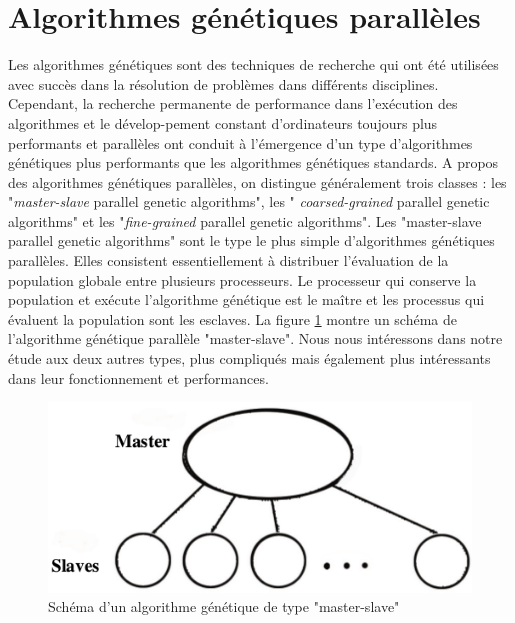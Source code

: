 \documentclass[12pt,a4paper]{article}
\begin{document}
	\section{Algorithmes génétiques parallèles}	
	Les algorithmes génétiques sont des techniques de recherche qui ont été utilisées avec succès dans la résolution de problèmes dans différents disciplines. Cependant, la recherche permanente de performance dans l'exécution des algorithmes et le dévelop-pement constant d'ordinateurs toujours plus performants et parallèles ont conduit à l'émergence d'un type d'algorithmes génétiques plus performants que les algorithmes génétiques standards. A propos des algorithmes génétiques parallèles, on distingue généralement trois classes : les "\emph{master-slave} parallel genetic algorithms", les "\emph{ coarsed-grained} parallel genetic algorithms" et les "\emph{fine-grained} parallel genetic algorithms". Les "master-slave parallel genetic algorithms" sont le type le plus simple d'algorithmes génétiques parallèles. Elles consistent essentiellement à distribuer l'évaluation de la population globale entre plusieurs processeurs. Le processeur qui conserve la population et exécute l'algorithme génétique est le maître et les processus qui évaluent la population sont les esclaves. La figure \ref{fig:master_slave_ga} montre un schéma de l'algorithme génétique parallèle "master-slave". Nous nous intéressons dans notre étude aux deux autres types, plus compliqués mais également plus intéressants dans leur fonctionnement et performances.
	
	\begin{figure}[!h]
		\begin{center}
			\includegraphics[scale=.3]{img/master_slave_ga.png}
			\caption{Schéma d'un algorithme génétique de type "master-slave"}
			\label{fig:master_slave_ga}
		\end{center}
	\end{figure}
	
	\newpage	
	
\end{document}
